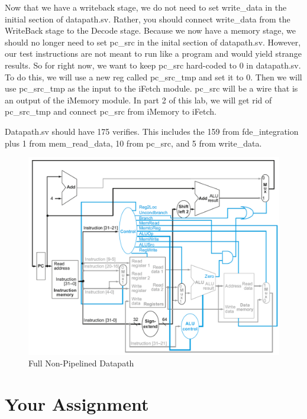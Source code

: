 Now that we have a writeback stage, we do not need to set write\_data in the initial section of datapath.sv.  Rather, you should connect write\_data from the WriteBack stage to the Decode stage.  Because we now have a memory stage, we should no longer need to set pc\_src in the inital section of datapath.sv.  However, our test instructions are not meant to run like a program and would yield strange results.  So for right now, we want to keep pc\_src hard-coded to 0 in datapath.sv.  To do this, we will use a new reg called pc\_src\_tmp and set it to 0.  Then we will use pc\_src\_tmp as the input to the iFetch module.  pc\_src will be a wire that is an output of the iMemory module.  In part 2 of this lab, we will get rid of pc\_src\_tmp and connect pc\_src from iMemory to iFetch.

Datapath.sv should have 175 verifies.  This includes the 159 from fde\_integration plus 1 from mem\_read\_data, 10 from pc\_src, and 5 from write\_data.

\begin{figure}
\caption{Full Non-Pipelined Datapath}\label{fig:datapath}
\begin{center}
\includegraphics[width=\textwidth]{../images/non_pipelined_datapath.png}
\end{center}
\end{figure}

\section{Your Assignment}


